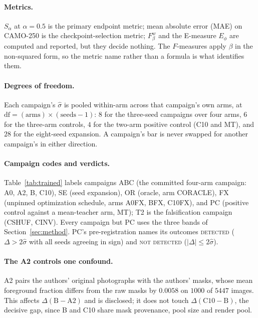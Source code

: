 \documentclass{article}
\begin{document}
\paragraph{Metrics.} $S_\alpha$ at $\alpha = 0.5$ is the primary endpoint metric; mean absolute
error (MAE) on CAMO-250 is the checkpoint-selection metric; $F_\beta^w$ and the E-measure $E_\phi$
are computed and reported, but they decide nothing.
The $F$-measures apply $\beta$ in the non-squared form, so the metric name rather than a formula is what identifies them.

\paragraph{Degrees of freedom.} Each campaign's $\hat{\sigma}$ is pooled within-arm across that
campaign's own arms, at $\mathrm{df} = (\text{arms}) \times (\text{seeds} - 1)$: $8$ for the
three-seed campaigns over four arms, $6$ for the three-arm controls, $4$ for the two-arm positive
control (C10 and MT), and $28$ for the eight-seed expansion. A campaign's bar is never swapped for another campaign's in either direction.

\paragraph{Campaign codes and verdicts.} Table~\ref{tab:trained} labels campaigns ABC (the committed
four-arm campaign: A0, A2, B, C10), SE (seed expansion), OR (oracle, arm CORACLE), FX (unpinned
optimization schedule, arms A0FX, BFX, C10FX), and PC (positive control against a mean-teacher arm,
MT); T2 is the falsification campaign (CSHUF, CINV). Every campaign but PC uses the three bands of
Section~\ref{sec:method}. PC's pre-registration names its outcomes \textsc{detected} ($\Delta > 2\hat{\sigma}$
with all seeds agreeing in sign) and \textsc{not detected} ($|\Delta| \le 2\hat{\sigma}$).

\paragraph{The A2 controls one confound.} A2 pairs the authors' original photographs with the
authors' masks, whose mean foreground fraction differs from the raw masks by $0.0058$ on $1000$ of
$5447$ images. This affects $\Delta(\mathrm{B}-\mathrm{A2})$ and is disclosed; it does not touch
$\Delta(\mathrm{C10}-\mathrm{B})$, the decisive gap, since B and C10 share mask provenance, pool
size and render pool.
\end{document}
